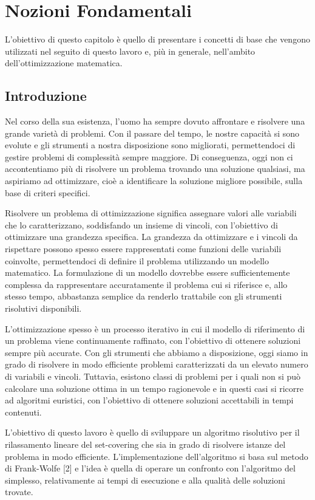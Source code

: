 \chapter{Nozioni Fondamentali}
L'obiettivo di  questo capitolo è quello di presentare i concetti di base che vengono utilizzati nel seguito di questo
lavoro e, più in generale, nell'ambito dell'ottimizzazione matematica.
\section{Introduzione}
Nel corso della sua esistenza, l’uomo ha sempre dovuto affrontare e risolvere una grande varietà di problemi. Con il
passare del tempo, le nostre capacità si sono evolute e gli strumenti a nostra disposizione sono migliorati,
permettendoci di gestire problemi di complessità sempre maggiore. Di conseguenza, oggi non ci accontentiamo più di
risolvere un problema trovando una soluzione qualsiasi, ma aspiriamo ad ottimizzare, cioè a identificare la soluzione
migliore possibile, sulla base di criteri specifici.

Risolvere un problema di ottimizzazione significa assegnare valori alle variabili che lo caratterizzano, soddisfando un
insieme di vincoli, con l'obiettivo di ottimizzare una grandezza specifica. La grandezza da ottimizzare e i vincoli da
rispettare possono spesso essere rappresentati come funzioni delle variabili coinvolte, permettendoci di definire il
problema utilizzando un modello matematico. La formulazione di un modello dovrebbe essere suﬀicientemente complessa da
rappresentare accuratamente il problema cui si riferisce e, allo stesso tempo, abbastanza semplice da renderlo
trattabile con gli strumenti risolutivi disponibili.

L'ottimizzazione spesso è un processo iterativo in cui il modello di riferimento di un problema viene continuamente
raffinato, con l'obiettivo di ottenere soluzioni sempre più accurate.
Con gli strumenti che abbiamo a disposizione, oggi siamo in grado di risolvere in modo efficiente problemi
caratterizzati da un elevato numero di variabili e vincoli. Tuttavia, esistono classi di problemi per i quali non si può
calcolare una soluzione ottima in un tempo ragionevole e in questi casi si ricorre ad algoritmi euristici, con
l'obiettivo di ottenere soluzioni accettabili in tempi contenuti.

L'obiettivo di questo lavoro è quello di sviluppare un algoritmo risolutivo per il rilassamento lineare del set-covering
che sia in grado di risolvere istanze del problema in modo efficiente. L'implementazione dell'algoritmo si basa sul
metodo di Frank-Wolfe [2] e l'idea è quella di operare un confronto con l'algoritmo del simplesso, relativamente ai tempi di
esecuzione e alla qualità delle soluzioni trovate.

